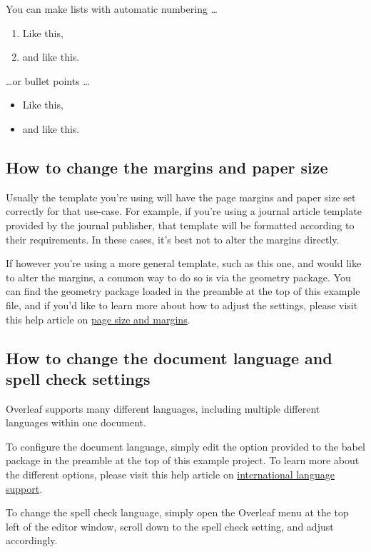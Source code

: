 \documentclass{article}
\begin{document}
You can make lists with automatic numbering \dots

\begin{enumerate}
\item Like this,
\item and like this.
\end{enumerate}
\dots or bullet points \dots
\begin{itemize}
\item Like this,
\item and like this.
\end{itemize}



\subsection{How to change the margins and paper size}

Usually the template you're using will have the page margins and paper size set correctly for that use-case. For example, if you're using a journal article template provided by the journal publisher, that template will be formatted according to their requirements. In these cases, it's best not to alter the margins directly.

If however you're using a more general template, such as this one, and would like to alter the margins, a common way to do so is via the geometry package. You can find the geometry package loaded in the preamble at the top of this example file, and if you'd like to learn more about how to adjust the settings, please visit this help article on \href{https://www.overleaf.com/learn/latex/page_size_and_margins}{page size and margins}.

\subsection{How to change the document language and spell check settings}

Overleaf supports many different languages, including multiple different languages within one document. 

To configure the document language, simply edit the option provided to the babel package in the preamble at the top of this example project. To learn more about the different options, please visit this help article on \href{https://www.overleaf.com/learn/latex/International_language_support}{international language support}.

To change the spell check language, simply open the Overleaf menu at the top left of the editor window, scroll down to the spell check setting, and adjust accordingly.
\end{document}
